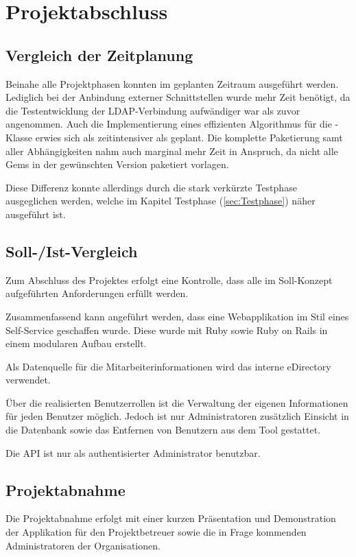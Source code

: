 \section{Projektabschluss}
\label{sec:Projektabschluss}

\subsection{Vergleich der Zeitplanung}
\label{sec:Vergleich der Zeitplanung}

Beinahe alle Projektphasen konnten im geplanten Zeitraum ausgeführt werden. Lediglich bei
der Anbindung externer Schnittstellen wurde mehr Zeit benötigt, da die Testentwicklung der
\acs{LDAP}-Verbindung aufwändiger war als zuvor angenommen. Auch die Implementierung eines
effizienten Algorithmus für die -Klasse erwies sich als zeitintensiver als geplant.
Die komplette Paketierung samt aller Abhängigkeiten nahm auch marginal mehr Zeit in Anspruch, da
nicht alle Gems in der gewünschten Version paketiert vorlagen.

Diese Differenz konnte allerdings durch die stark verkürzte Testphase ausgeglichen werden, welche im
Kapitel Testphase (\Vgl \ref{sec:Testphase}) näher ausgeführt ist.


\subsection{Soll-/Ist-Vergleich}
\label{sec:SollIstVergleich}
Zum Abschluss des Projektes erfolgt eine Kontrolle, dass alle im Soll-Konzept aufgeführten
Anforderungen erfüllt werden.

Zusammenfassend kann angeführt werden, dass eine Webapplikation im Stil eines Self-Service
geschaffen wurde. Diese wurde mit Ruby sowie Ruby on Rails in einem modularen Aufbau erstellt.

Als Datenquelle für die Mitarbeiterinformationen wird das interne eDirectory verwendet.

Über die realisierten Benutzerrollen ist die Verwaltung der eigenen Informationen für jeden Benutzer
möglich. Jedoch ist nur Administratoren zusätzlich Einsicht in die Datenbank sowie das Entfernen von
Benutzern aus dem Tool gestattet.

Die API ist nur als authentisierter Administrator benutzbar.

\subsection{Projektabnahme}
\label{sec:Projektabnahme}
Die Projektabnahme erfolgt mit einer kurzen Präsentation und Demonstration der Applikation für den
Projektbetreuer sowie die in Frage kommenden Administratoren der Organisationen.

